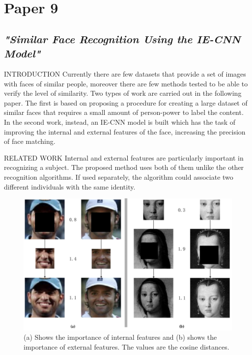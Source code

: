 \section{Paper 9}
\subsection{\emph{"Similar Face Recognition Using the IE-CNN Model"}}

\begin{frame}{INTRODUCTION}
    Currently there are few datasets that provide a set of images with faces of 
    similar people, moreover there are few methods tested to be able to verify 
    the level of similarity. Two types of work are carried out in the following paper. 
    The first is based on proposing a procedure for creating a large dataset of 
    similar faces that requires a small amount of person-power to label the content. 
    In the second work, instead, an IE-CNN model is built which has the task 
    of improving the internal and external features of the face, increasing the 
    precision of face matching.
\end{frame}

\begin{frame}{RELATED WORK}
    Internal and external features are particularly important in recognizing a 
    subject. The proposed method uses both of them unlike the other 
    recognition algorithms. If used separately, the algorithm could associate 
    two different individuals with the same identity.
    \begin{figure}[h!]
        \centering
        \includegraphics[width = 0.6\linewidth]{images/paper9/importance.png}
        \centering
        \caption{(a) Shows the importance of internal features and (b) shows the importance of external features. The values are the cosine distances.}
        \label{fig:features}
    \end{figure} 
\end{frame}

